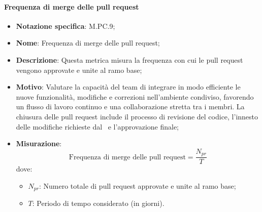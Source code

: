 \paragraph*{Frequenza di merge delle pull request}
\begin{itemize}
    \item \textbf{Notazione specifica}: M.PC.9;
    \item \textbf{Nome}: Frequenza di merge delle pull request;
    \item \textbf{Descrizione}: Questa metrica misura la frequenza con cui le pull request vengono approvate e unite al ramo base;
    \item \textbf{Motivo}: Valutare la capacità del team di integrare in modo efficiente le nuove funzionalità, modifiche e correzioni nell’ambiente condiviso, favorendo un flusso di lavoro continuo e una collaborazione  stretta tra i membri. La chiusura delle pull request include il processo di revisione del codice, l’innesto delle modifiche richieste dal \Verificatore\ e l’approvazione finale;
    \item \textbf{Misurazione}:
    \[
        \text{Frequenza di merge delle pull request} = \frac{N_{pr}}{T}
    \]
    dove:
    \begin{itemize}
        \item $N_{pr}$: Numero totale di pull request approvate e unite al ramo base;
        \item $T$: Periodo di tempo considerato (in giorni).
    \end{itemize}
\end{itemize}
